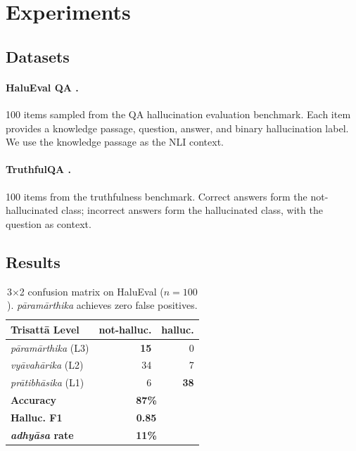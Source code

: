 \documentclass[11pt]{article}
\newcommand{\param}{\textcolor{paramcol}{\textit{pāramārthika}}}
\newcommand{\vyav}{\textcolor{vyavcol}{\textit{vyāvahārika}}}
\newcommand{\prati}{\textcolor{praticol}{\textit{prātibhāsika}}}
\newcommand{\adhyasa}{\textcolor{adhyasacol}{\textit{adhyāsa}}}
\begin{document}
\section{Experiments}
\label{sec:exp}

\subsection{Datasets}

\paragraph{HaluEval QA \cite{halueval2023}.}
100 items sampled from the QA hallucination evaluation benchmark. Each item
provides a knowledge passage, question, answer, and binary hallucination label.
We use the knowledge passage as the NLI context.

\paragraph{TruthfulQA \cite{lin2022truthfulqa}.}
100 items from the truthfulness benchmark. Correct answers form the
not-hallucinated class; incorrect answers form the hallucinated class, with
the question as context.

\subsection{Results}

\begin{table}[t]
\centering
\small
\begin{tabular}{lrr}
\toprule
\textbf{Trisattā Level} & \textbf{not-halluc.} & \textbf{halluc.} \\
\midrule
\param{} (L3) & \textbf{15} & 0 \\
\vyav{} (L2)  & 34 & 7 \\
\prati{} (L1) & 6  & \textbf{38} \\
\midrule
\textbf{Accuracy} & \multicolumn{2}{c}{\textbf{87\%}} \\
\textbf{Halluc. F1} & \multicolumn{2}{c}{\textbf{0.85}} \\
\textbf{\adhyasa{} rate} & \multicolumn{2}{c}{\textbf{11\%}} \\
\bottomrule
\end{tabular}
\caption{3$\times$2 confusion matrix on HaluEval ($n=100$). \param{} achieves zero false positives.}
\label{tab:halueval}
\end{table}
\end{document}
